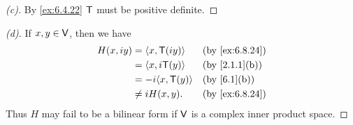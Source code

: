 \begin{proof}[(c)]
  By \cref{ex:6.4.22} \(\mathsf{T}\) must be positive definite.
\end{proof}

\begin{proof}[(d)]
  If \(x, y \in \mathsf{V}\), then we have
  \begin{align*}
    H(x, iy) & = \inn{x, \T(iy)}   &  & \by{ex:6.8.24} \\
             & = \inn{x, i \T(y)}  &  & \by{2.1.1}[b]  \\
             & = -i \inn{x, \T(y)} &  & \by{6.1}[b]    \\
             & \neq i H(x, y).     &  & \by{ex:6.8.24}
  \end{align*}
  Thus \(H\) may fail to be a bilinear form if \(\mathsf{V}\) is a complex inner product space.
\end{proof}
